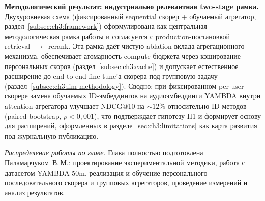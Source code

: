 \textbf{Методологический результат: индустриально релевантная two-stage рамка.} Двухуровневая схема (фиксированный sequential скорер + обучаемый агрегатор, раздел~\ref{subsec:ch3:framework}) сформулирована как центральная методологическая рамка работы и согласуется с production-постановкой retrieval~$\to$~rerank. Эта рамка даёт чистую ablation вклада агрегационного механизма, обеспечивает атомарность compute-бюджета через кэширование персональных скоров (раздел~\ref{subsec:ch3:cache}) и допускает естественное расширение до end-to-end fine-tune'а скорера под групповую задачу (раздел~\ref{subsec:ch3:lim-methodology}). Сводно: при фиксированном per-user скорере замена обучаемых ID-эмбеддингов на аудиоэмбеддинги YAMBDA внутри attention-агрегатора улучшает NDCG@10 на $\sim$$12\%$ относительно ID-методов (paired bootstrap, $p < 0{,}001$), что подтверждает гипотезу H1 и формирует основу для расширений, оформленных в разделе~\ref{sec:ch3:limitations} как карта развития под журнальную публикацию.

\textit{Распределение работы по главе.} Глава полностью подготовлена Паламарчуком~В.\,М.: проектирование экспериментальной методики, работа с датасетом YAMBDA-50m, реализация и обучение персонального последовательного скорера и групповых агрегаторов, проведение измерений и анализ результатов.
